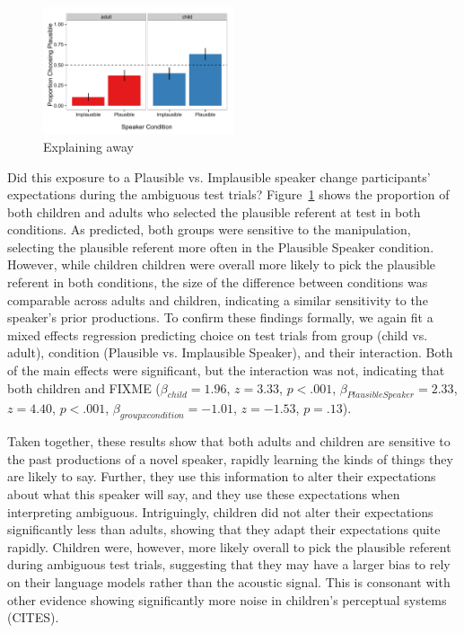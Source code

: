 \documentclass[man,floatsintext]{apa6}
\begin{document}
\begin{figure}[t]
     \begin{center}
     \includegraphics[width=0.5\textwidth]{figures/exp1_results.pdf}
    \end{center}
    \caption{Explaining away}%
   \label{fig:exp1_results}
\end{figure}

Did this exposure to a Plausible vs. Implausible speaker change participants' expectations during the ambiguous test trials? Figure~\ref{fig:exp1_results} shows the proportion of both children and adults who selected the plausible referent at test in both conditions. As predicted, both groups were sensitive to the manipulation, selecting the plausible referent more often in the Plausible Speaker condition. However, while children children were overall more likely to pick the plausible referent in both conditions, the size of the difference between conditions was comparable across adults and children, indicating a similar sensitivity to the speaker's prior productions. To confirm these findings formally, we again fit a mixed effects regression predicting choice on test trials from group (child vs. adult), condition (Plausible vs. Implausible Speaker), and their interaction. Both of the main effects were significant, but the interaction was not, indicating that both children and FIXME ($\beta_{child} = 1.96$,  $z = 3.33$, $p <.001$, $\beta_{Plausible Speaker} = 2.33$,  $z = 4.40$, $p <.001$,  $\beta_{group x condition} = -1.01$,  $z = -1.53$, $p = .13$).

Taken together, these results show that both adults and children are sensitive to the past productions of a novel speaker, rapidly learning the kinds of things they are likely to say. Further, they use this information to alter their expectations about what this speaker will say, and they use these expectations when interpreting ambiguous. Intriguingly, children did not alter their expectations significantly less than adults, showing that they adapt their expectations quite rapidly. Children were, however, more likely overall to pick the plausible referent during ambiguous test trials, suggesting that they may have a larger bias to rely on their language models rather than the acoustic signal. This is consonant with other evidence showing significantly more noise in children's perceptual systems (CITES).
\end{document}
